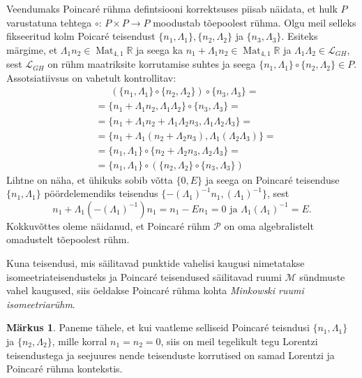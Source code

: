 \documentclass[12pt,a4paper,oneside]{article}
\theoremstyle{plain}
\theoremstyle{definition}
\newtheorem{markus}{Märkus}[section]
\numberwithin{equation}{section}
\def\R{{\mathbb R}}
\def\L{{\mathcal L}}
\def\M{{\mathcal M}}
\def\P{{\mathcal P}}
\DeclareMathOperator{\Mat}{Mat}
\begin{document}
Veendumaks Poincar\'e rühma defintsiooni korrektsuses piisab 
näidata, et hulk $P$ varustatuna tehtega 
$\circ \colon\, P \times P \rightarrow P$ moodustab tõepoolest rühma.
Olgu meil selleks fikseeritud kolm Poicar\'e teisendust 
$\{n_1, \Lambda_1\}, \{n_2, \Lambda_2\}$ ja $\{n_3, \Lambda_3\}$. 
Esiteks märgime, et $ \Lambda_1 n_2 \in \Mat_{4, 1}\R$ ja seega ka 
$n_1 + \Lambda_1 n_2 \in \Mat_{4, 1}\R$ ja $\Lambda_1 \Lambda_2 \in 
\L_{GH}$, sest $\L_{GH}$ on rühm maatriksite korrutamise suhtes ja 
seega $\{n_1, \Lambda_1\} \circ \{n_2, \Lambda_2\} \in P$.
Assotsiatiivsus on vahetult kontrollitav:
\begin{align*}
&\phantom{=\ }\left(\{n_1, \Lambda_1\} \circ \{n_2, \Lambda_2\}\right) \circ 
\{n_3, \Lambda_3\} = \\
%
&= \{n_1 + \Lambda_1 n_2, \Lambda_1 \Lambda_2 \} 
\circ \{n_3, \Lambda_3 \} = \\
%
&= \{n_1 + \Lambda_1 n_2 + \Lambda_1 \Lambda_2 n_3, \Lambda_1 
\Lambda_2 \Lambda_3 \} = \\
%
&= \{n_1 + \Lambda_1 \left( n_2 + 
\Lambda_2 n_3 \right), \Lambda_1 \left( \Lambda_2 
\Lambda_3 \right)\} = \\
%
&= \{n_1, \Lambda_1 \} \circ \{n_2 + \Lambda_2 n_3, \Lambda_2 
\Lambda_3 \} = \\
%
&= \{n_1, \Lambda_1\} \circ \left( \{n_2, \Lambda_2\} 
\circ \{n_3, \Lambda_3\} \right)
\end{align*}
Lihtne on näha, et ühikuks sobib võtta $\{0, E\}$ ja seega on 
Poincar\'e teisenduse $\{n_1, \Lambda_1\}$ pöördelemendiks 
teisendus $\{ -\left(\Lambda_1\right)^{-1} n_1, 
\left(\Lambda_1\right)^{-1} \}$, sest
\[ n_1 + \Lambda_1 \left(-\left(\Lambda_1\right)^{-1}\right) n_1 = 
n_1 - E n_1 = 0 \text{ ja } 
\Lambda_1 \left(\Lambda_1\right)^{-1} = E. \]
Kokkuvõttes oleme näidanud, et Poincar\'e rühm $\P$ on oma 
algebralistelt omadustelt tõepoolest rühm.

Kuna teisendusi, mis säilitavad punktide vahelisi kaugusi 
nimetatakse isomeetriateisendusteks ja Poincar\'e teisendused 
säilitavad ruumi $\M$ sündmuste vahel kaugused, siis öeldakse 
Poincar\'e rühma kohta \emph{Minkowski ruumi isomeetriarühm}.

\begin{markus}
Paneme tähele, et kui vaatleme selliseid Poincar\'e teisndusi 
$\{n_1, \Lambda_1\}$ ja $\{n_2, \Lambda_2\}$, mille korral $n_1 = 
n_2 = 0$, siis on meil tegelikult tegu Lorentzi teisendustega ja 
seejuures nende teisenduste korrutised on samad Lorentzi ja 
Poincar\'e rühma kontekstis.
\end{markus}
\end{document}
